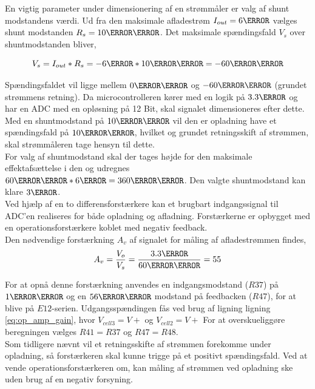 En vigtig parameter under dimensionering af en strømmåler er valg af shunt modstandens værdi. Ud fra den maksimale afladestrøm $I_{out} = 6\ampere$ vælges shunt modstanden $R_{s} = 10\milli\ohm$. Det maksimale spændingsfald $V_{s}$ over shuntmodstanden bliver,

\begin {equation} 
V_{s} = I_{out} * R_{s}  = -6\ampere * 10\milli\ohm = -60\milli\volt
\end {equation}

Spændingsfaldet vil ligge mellem $0\milli\volt$ og $-60\milli\volt$ (grundet strømmens retning). Da microcontrolleren kører med en logik på $3.3\volt$ og har en ADC med en opløsning på 12 Bit, skal signalet dimensioneres efter dette. Med en shuntmodstand på $10\milli\ohm$ vil den er opladning have et spændingsfald på $10\milli\volt$, hvilket og grundet retningsskift af strømmen, skal strømmåleren tage hensyn til dette.
\\
For valg af shuntmodstand skal der tages højde for den maksimale effektafsættelse i den og udregnes $60\milli\volt * 6\ampere = 360\milli\watt$. Den valgte shuntmodstand kan klare $3\watt$.
\\

Ved hjælp af en to differensforstærkere kan et brugbart indgangssignal til ADC'en realiseres for både opladning og afladning. Forstærkerne er opbygget med en operationsforstærkere koblet med negativ feedback.
\\

Den nødvendige forstærkning $A_{v}$ af signalet for måling af afladestrømmen findes,
\begin {equation} 
A_{v} = \frac{V_{o}}{V_{s}} = \frac{3.3\volt}{60\milli\volt} = 55
\end {equation}

For at opnå denne forstærkning anvendes en indgangsmodstand ($R37$) på $1\kilo\ohm$ og en $56\kilo\ohm$ modstand på feedbacken ($R47$), for at blive på $E12$-serien. Udgangsspændingen fås ved brug af ligning ligning \ref{eq:op_amp_gain}, hvor $V_{cell3} = V+$ og $V_{cell2} = V+$
For at overskueliggøre beregningen vælges $R41 = R37$ og $R47 = R48$.
\\

Som tidligere nævnt vil et retningsskifte af strømmen forekomme under opladning, så forstærkeren skal kunne trigge på et positivt spændingsfald. Ved at vende operationsforstærkeren om, kan måling af strømmen ved opladning ske uden brug af en negativ forsyning.
\\

